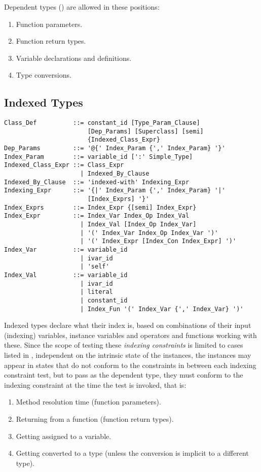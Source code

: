 Dependent types () are allowed in these positions: 
\begin{enumerate}
\item Function parameters. 
\item Function return types. 
\item Variable declarations and definitions. 
\item Type conversions. 
\end{enumerate}

\subsection{Indexed Types}
\label{sec:indexed-types}

\syntax\begin{lstlisting}
Class_Def          ::= constant_id [Type_Param_Clause] 
                       [Dep_Params] [Superclass] [semi] 
                       {Indexed_Class_Expr}
Dep_Params         ::= '@{' Index_Param {',' Index_Param} '}'
Index_Param        ::= variable_id [':' Simple_Type]
Indexed_Class_Expr ::= Class_Expr
                     | Indexed_By_Clause
Indexed_By_Clause  ::= 'indexed-with' Indexing_Expr
Indexing_Expr      ::= '{|' Index_Param {',' Index_Param} '|'
                       [Index_Exprs] '}'
Index_Exprs        ::= Index_Expr {[semi] Index_Expr}
Index_Expr         ::= Index_Var Index_Op Index_Val
                     | Index_Val [Index_Op Index_Var]
                     | '(' Index_Var Index_Op Index_Var ')'
                     | '(' Index_Expr [Index_Con Index_Expr] ')'
Index_Var          ::= variable_id 
                     | ivar_id
                     | 'self'
Index_Val          ::= variable_id 
                     | ivar_id 
                     | literal
                     | constant_id
                     | Index_Fun '(' Index_Var {',' Index_Var} ')'
\end{lstlisting}

Indexed types declare what their index is, based on combinations of their input (indexing) variables, instance variables and operators and functions working with these. Since the scope of testing these {\em indexing constraints} is limited to cases listed in , independent on the intrinsic state of the instances, the instances may appear in states that do not conform to the constraints in between each indexing constraint test, but to pass as the dependent type, they must conform to the indexing constraint at the time the test is invoked, that is: 
\begin{enumerate}
\item Method resolution time (function parameters). 
\item Returning from a function (function return types). 
\item Getting assigned to a variable. 
\item Getting converted to a type (unless the conversion is implicit to a different type). 
\end{enumerate}

